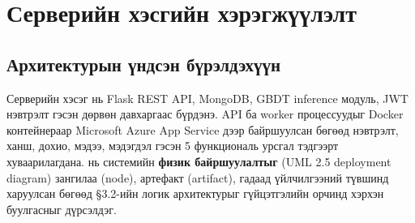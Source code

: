 \section{Серверийн хэсгийн хэрэгжүүлэлт}

\subsection{Архитектурын үндсэн бүрэлдэхүүн}

Серверийн хэсэг нь Flask REST API, MongoDB, GBDT inference модуль, JWT нэвтрэлт гэсэн дөрвөн давхаргаас бүрдэнэ. API ба worker процессуудыг Docker контейнераар Microsoft Azure App Service дээр байршуулсан бөгөөд нэвтрэлт, ханш, дохио, мэдээ, мэдэгдэл гэсэн 5 функциональ урсгал тэдгээрт хуваарилагдана.  нь системийн \textbf{физик байршуулалтыг} (UML 2.5 deployment diagram) зангилаа (node), артефакт (artifact), гадаад үйлчилгээний түвшинд харуулсан бөгөөд §3.2-ийн логик архитектурыг гүйцэтгэлийн орчинд хэрхэн буулгасныг дүрсэлдэг.

